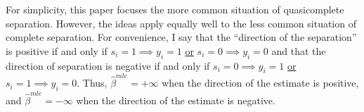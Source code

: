 \documentclass[12pt]{article}
\begin{document}
For simplicity, this paper focuses the more common situation of quasicomplete separation. However, the ideas apply equally well to the less common situation of complete separation.  For convenience, I say that the ``direction of the separation'' is positive if and only if $s_i = 1 \implies y_i = 1$ \underline{or} $s_i = 0 \implies y_i = 0$ and that the direction of separation is negative if and only if $s_i = 0 \implies y_i = 1$ \underline{or} $s_i = 1 \implies y_i = 0$. Thus, $\hat{\beta}^{mle} = +\infty$ when the direction of the estimate is positive, and $\hat{\beta}^{mle} = -\infty$ when the direction of the estimate is negative.

\end{document}
